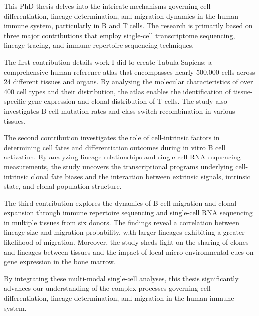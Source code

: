 This PhD thesis delves into the intricate mechanisms governing cell differentiation, lineage determination, and migration dynamics in the human immune system, particularly in B and T cells. The research is primarily based on three major contributions that employ single-cell transcriptome sequencing, lineage tracing, and immune repertoire sequencing techniques.

The first contribution details work I did to create Tabula Sapiens: a comprehensive human reference atlas that encompasses nearly 500,000 cells across 24 different tissues and organs. By analyzing the molecular characteristics of over 400 cell types and their distribution, the atlas enables the identification of tissue-specific gene expression and clonal distribution of T cells. The study also investigates B cell mutation rates and class-switch recombination in various tissues.

The second contribution investigates the role of cell-intrinsic factors in determining cell fates and differentiation outcomes during in vitro B cell activation. By analyzing lineage relationships and single-cell RNA sequencing measurements, the study uncovers the transcriptional programs underlying cell-intrinsic clonal fate biases and the interaction between extrinsic signals, intrinsic state, and clonal population structure. 

The third contribution explores the dynamics of B cell migration and clonal expansion through immune repertoire sequencing and single-cell RNA sequencing in multiple tissues from six donors. The findings reveal a correlation between lineage size and migration probability, with larger lineages exhibiting a greater likelihood of migration. Moreover, the study sheds light on the sharing of clones and lineages between tissues and the impact of local micro-environmental cues on gene expression in the bone marrow.

By integrating these multi-modal single-cell analyses, this thesis significantly advances our understanding of the complex processes governing cell differentiation, lineage determination, and migration in the human immune system. 